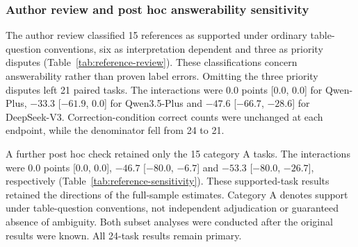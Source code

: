 \subsubsection{Author review and post hoc answerability sensitivity}
The author review classified 15 references as supported under ordinary table-question conventions, six as interpretation dependent and three as priority disputes (Table~\ref{tab:reference-review}). These classifications concern answerability rather than proven label errors. Omitting the three priority disputes left 21 paired tasks. The interactions were 0.0 points [0.0, 0.0] for Qwen-Plus, $-33.3$ [$-61.9$, 0.0] for Qwen3.5-Plus and $-47.6$ [$-66.7$, $-28.6$] for DeepSeek-V3. Correction-condition correct counts were unchanged at each endpoint, while the denominator fell from 24 to 21.

A further post hoc check retained only the 15 category A tasks. The interactions were 0.0 points [0.0, 0.0], $-46.7$ [$-80.0$, $-6.7$] and $-53.3$ [$-80.0$, $-26.7$], respectively (Table~\ref{tab:reference-sensitivity}). These supported-task results retained the directions of the full-sample estimates. Category A denotes support under table-question conventions, not independent adjudication or guaranteed absence of ambiguity. Both subset analyses were conducted after the original results were known. All 24-task results remain primary.
